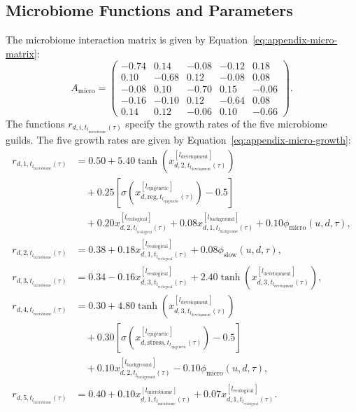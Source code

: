 \documentclass[11pt]{article}
\begin{document}
\subsection{Microbiome Functions and Parameters}
The microbiome interaction matrix is given by Equation~\ref{eq:appendix-micro-matrix}:
\begin{equation}
A_{\mathrm{micro}}
=
\begin{pmatrix}
-0.74 & 0.14 & -0.08 & -0.12 & 0.18\\
0.10 & -0.68 & 0.12 & -0.08 & 0.08\\
-0.08 & 0.10 & -0.70 & 0.15 & -0.06\\
-0.16 & -0.10 & 0.12 & -0.64 & 0.08\\
0.14 & 0.12 & -0.06 & 0.10 & -0.66
\end{pmatrix}.
\label{eq:appendix-micro-matrix}
\end{equation}
The functions $r_{d,i,t_{l_{\mathrm{microbiome}}}(\tau)}$ specify the growth rates of the five microbiome guilds. The five growth rates are given by Equation~\ref{eq:appendix-micro-growth}:
\begin{equation}
\begin{aligned}
r_{d,1,t_{l_{\mathrm{microbiome}}}(\tau)}
&=0.50
+5.40\tanh\!\left(
x^{[l_{\mathrm{development}}]}_{d,2,t_{l_{\mathrm{development}}}(\tau)}
\right)\\
&\quad
+0.25\left[
\sigma\!\left(
x^{[l_{\mathrm{epigenetic}}]}_{d,\mathrm{reg},t_{l_{\mathrm{epigenetic}}}(\tau)}
\right)-0.5
\right]\\
&\quad
+0.20x^{[l_{\mathrm{ecological}}]}_{d,2,t_{l_{\mathrm{ecological}}}(\tau)}
+0.08x^{[l_{\mathrm{background}}]}_{d,1,t_{l_{\mathrm{background}}}(\tau)}
+0.10\phi_{\mathrm{micro}}(u,d,\tau),\\
r_{d,2,t_{l_{\mathrm{microbiome}}}(\tau)}
&=0.38
+0.18x^{[l_{\mathrm{ecological}}]}_{d,1,t_{l_{\mathrm{ecological}}}(\tau)}
+0.08\phi_{\mathrm{slow}}(u,d,\tau),\\
r_{d,3,t_{l_{\mathrm{microbiome}}}(\tau)}
&=0.34
-0.16x^{[l_{\mathrm{ecological}}]}_{d,3,t_{l_{\mathrm{ecological}}}(\tau)}
+2.40\tanh\!\left(
x^{[l_{\mathrm{development}}]}_{d,3,t_{l_{\mathrm{development}}}(\tau)}
\right),\\
r_{d,4,t_{l_{\mathrm{microbiome}}}(\tau)}
&=0.30
+4.80\tanh\!\left(
x^{[l_{\mathrm{development}}]}_{d,3,t_{l_{\mathrm{development}}}(\tau)}
\right)\\
&\quad
+0.30\left[
\sigma\!\left(
x^{[l_{\mathrm{epigenetic}}]}_{d,\mathrm{stress},t_{l_{\mathrm{epigenetic}}}(\tau)}
\right)-0.5
\right]\\
&\quad
+0.10x^{[l_{\mathrm{background}}]}_{d,2,t_{l_{\mathrm{background}}}(\tau)}
-0.10\phi_{\mathrm{micro}}(u,d,\tau),\\
r_{d,5,t_{l_{\mathrm{microbiome}}}(\tau)}
&=0.40
+0.10x^{[l_{\mathrm{microbiome}}]}_{d,1,t_{l_{\mathrm{microbiome}}}(\tau)}
+0.07x^{[l_{\mathrm{ecological}}]}_{d,1,t_{l_{\mathrm{ecological}}}(\tau)}.
\end{aligned}
\label{eq:appendix-micro-growth}
\end{equation}
\end{document}
